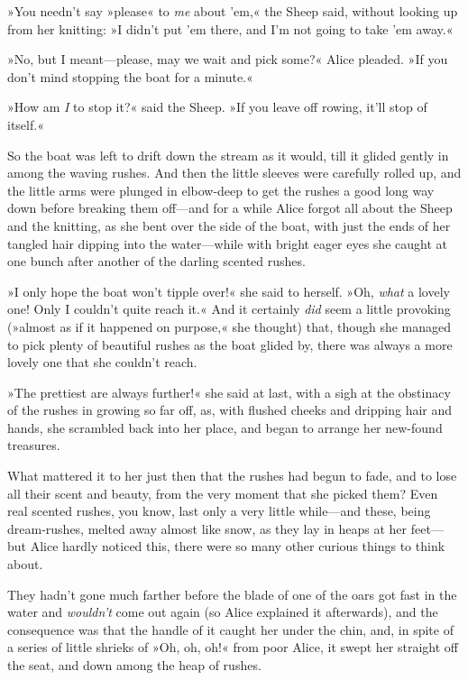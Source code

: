 »You needn't say »please« to \textit{me} about 'em,« the Sheep said, without looking up from her knitting: »I didn't put 'em there, and I'm not going to take 'em away.«

»No, but I meant—please, may we wait and pick some?« Alice pleaded. »If you don't mind stopping the boat for a minute.«

»How am \textit{I} to stop it?« said the Sheep. »If you leave off rowing, it'll stop of itself.«

So the boat was left to drift down the stream as it would, till it glided gently in among the waving rushes. And then the little sleeves were carefully rolled up, and the little arms were plunged in elbow-deep to get the rushes a good long way down before breaking them off—and for a while Alice forgot all about the Sheep and the knitting, as she bent over the side of the boat, with just the ends of her tangled hair dipping into the water—while with bright eager eyes she caught at one bunch after another of the darling scented rushes.

»I only hope the boat won't tipple over!« she said to herself. »Oh, \textit{what} a lovely one! Only I couldn't quite reach it.« And it certainly \textit{did} seem a little provoking (»almost as if it happened on purpose,« she thought) that, though she managed to pick plenty of beautiful rushes as the boat glided by, there was always a more lovely one that she couldn't reach.

»The prettiest are always further!« she said at last, with a sigh at the obstinacy of the rushes in growing so far off, as, with flushed cheeks and dripping hair and hands, she scrambled back into her place, and began to arrange her new-found treasures.

What mattered it to her just then that the rushes had begun to fade, and to lose all their scent and beauty, from the very moment that she picked them? Even real scented rushes, you know, last only a very little while—and these, being dream-rushes, melted away almost like snow, as they lay in heaps at her feet—but Alice hardly noticed this, there were so many other curious things to think about.

They hadn't gone much farther before the blade of one of the oars got fast in the water and \textit{wouldn't} come out again (so Alice explained it afterwards), and the consequence was that the handle of it caught her under the chin, and, in spite of a series of little shrieks of »Oh, oh, oh!« from poor Alice, it swept her straight off the seat, and down among the heap of rushes.

